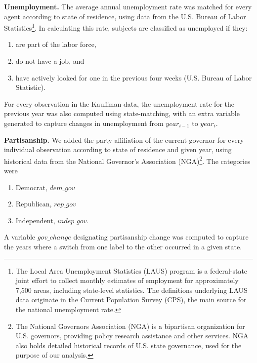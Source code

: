 \textbf{Unemployment.} The average annual unemployment rate was matched for every agent according to state of residence, using data from the U.S. Bureau of Labor Statistics\footnote{The Local Area Unemployment Statistics (LAUS) program is a federal-state joint effort to collect monthly estimates of employment for approximately 7,500 areas, including state-level statistics. The definitions underlying LAUS data originate in the Current Population Survey (CPS),  the main source for the national unemployment rate. 
}. In calculating this rate, subjects are classified as unemployed if they:
\renewcommand{\labelenumi}{\roman{enumi}}
\begin{enumerate}
    \singlespacing
    \item are part of the labor force,
    \item do not have a job, and
    \item have actively looked for one in the previous four weeks (U.S. Bureau of Labor Statistic). 
    
\end{enumerate}


For every observation in the Kauffman data, the unemployment rate for the previous year was also computed using state-matching, with an extra variable generated to capture changes in unemployment from $year_{i-1}$ to $year_{i}$. 

\textbf{Partisanship.} We added the party affiliation of the current governor for every individual observation according to state of residence and given year, using historical data from the National Governor’s Association (NGA)\footnote{The National Governors Association (NGA) is a bipartisan organization for U.S. governors, providing policy research assistance and other services. NGA also holds detailed historical records of U.S. state governance, used for the purpose of our analysis.}. The categories were 

\renewcommand{\labelenumi}{\roman{enumi}}
\begin{enumerate}
\singlespacing
\item Democrat, $dem\_gov$
\item Republican, $rep\_gov$  
\item Independent, $indep\_gov$.
\end{enumerate}

A variable $gov\_change$ designating partisanship change was computed to capture the years where a switch from one label to the other occurred in a given state. 

